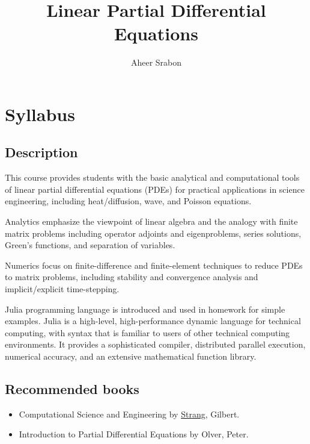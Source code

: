 \documentclass{article}
\title{Linear Partial Differential Equations}
\author{Aheer Srabon}
\theoremstyle{mytheoremstyle}
\theoremstyle{mytheoremstyle}
\theoremstyle{myproblemstyle}
\begin{document}
    \maketitle

    \section{Syllabus}
    \subsection{Description}
    \noindent This course provides students with the basic analytical and computational tools 
    of linear partial differential equations (PDEs) for practical applications in science 
    engineering, including heat/diffusion, wave, and Poisson equations.

    Analytics emphasize the viewpoint of linear algebra and the analogy with finite matrix
    problems including operator adjoints and eigenproblems, series solutions, Green’s functions,
    and separation of variables.

    Numerics focus on finite-difference and finite-element techniques to reduce PDEs to matrix
    problems, including stability and convergence analysis and implicit/explicit time-stepping.

    Julia programming language is introduced and used in homework for simple examples.
    Julia is a high-level, high-performance dynamic language for technical computing,
    with syntax that is familiar to users of other technical computing environments.
    It provides a sophisticated compiler, distributed parallel execution, numerical accuracy,
    and an extensive mathematical function library.

    \subsection{Recommended books}
    \begin{itemize}
    	\item Computational Science and Engineering by 
		\href{https://math.mit.edu/~gs/cse/}{Strang}, Gilbert.
	\item Introduction to Partial Differential Equations by Olver, Peter.
    \end{itemize}
\end{document}
